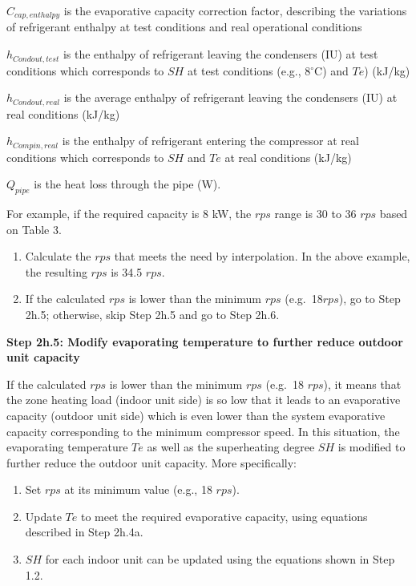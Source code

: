 \(C_{cap,enthalpy}\) is the evaporative capacity correction factor, describing the variations of refrigerant enthalpy at test conditions and real operational conditions

\(h_{Condout,test}\) is the enthalpy of refrigerant leaving the condensers (IU) at test conditions which corresponds to \(SH\) at test conditions (e.g., 8\(^{\circ}\)C) and \(Te\)) (kJ/kg)

\(h_{Condout,real}\) is the average enthalpy of refrigerant leaving the condensers (IU) at real conditions (kJ/kg)

\(h_{Compin,real}\) is the enthalpy of refrigerant entering the compressor at real conditions which corresponds to \(SH\) and \(Te\) at real conditions (kJ/kg)

\(Q_{pipe}\) is the heat loss through the pipe (W).

For example, if the required capacity is 8 kW, the \(rps\) range is 30 to 36 \(rps\) based on Table 3.

\begin{enumerate}
\def\labelenumi{\alph{enumi}.}
\setcounter{enumi}{2}
\item
  Calculate the \(rps\) that meets the need by interpolation. In the above example, the resulting \(rps\) is 34.5 \(rps\).
\item
  If the calculated \(rps\) is lower than the minimum \(rps\) (e.g.~18\(rps\)), go to Step 2h.5; otherwise, skip Step 2h.5 and go to Step 2h.6.
\end{enumerate}

\textbf{Step 2h.5: Modify evaporating temperature to further reduce outdoor unit capacity}

If the calculated \(rps\) is lower than the minimum \(rps\) (e.g.~18 \(rps\)), it means that the zone heating load (indoor unit side) is so low that it leads to an evaporative capacity (outdoor unit side) which is even lower than the system evaporative capacity corresponding to the minimum compressor speed. In this situation, the evaporating temperature \(Te\) as well as the superheating degree \(SH\) is modified to further reduce the outdoor unit capacity. More specifically:

\begin{enumerate}
\def\labelenumi{\alph{enumi}.}
\item
  Set \(rps\) at its minimum value (e.g., 18 \(rps\)).
\item
  Update \(Te\) to meet the required evaporative capacity, using equations described in Step 2h.4a.
\item
  \(SH\) for each indoor unit can be updated using the equations shown in Step 1.2.
\end{enumerate}

